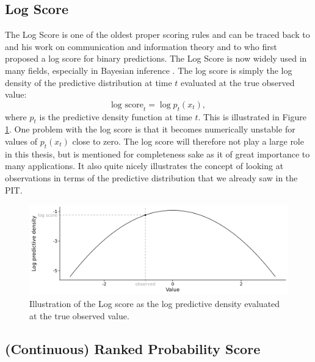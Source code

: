 \documentclass[
]{book}
\begin{document}
\hypertarget{log-score}{%
\subsection{Log Score}\label{log-score}}

The Log Score is one of the oldest proper scoring rules and can be traced back to \citet{shannonMathematicalTheoryCommunication1948} and his work on communication and information theory and to \citet{goodRationalDecisions1952} who first proposed a log score for binary predictions. The Log Score is now widely used in many fields, especially in Bayesian inference \citep{gelmanUnderstandingPredictiveInformation2014}. The log score is simply the log density of the predictive distribution at time \(t\) evaluated at the true observed value:
\[ \text{log score}_t = \log p_t(x_t),\]
where \(p_t\) is the predictive density function at time \(t\). This is illustrated in Figure \ref{fig:log-score}. One problem with the log score is that it becomes numerically unstable for values of \(p_t(x_t)\) close to zero. The log score will therefore not play a large role in this thesis, but is mentioned for completeness sake as it of great importance to many applications. It also quite nicely illustrates the concept of looking at observations in terms of the predictive distribution that we already saw in the PIT.

\begin{figure}

{\centering \includegraphics[width=1\linewidth]{../visualisation/chapter-3-evaluation/log-score-example} 

}

\caption{Illustration of the Log score as the log predictive density evaluated at the true observed value.}\label{fig:log-score}
\end{figure}

\hypertarget{continuous-ranked-probability-score}{%
\subsection{(Continuous) Ranked Probability Score}\label{continuous-ranked-probability-score}}
\end{document}
